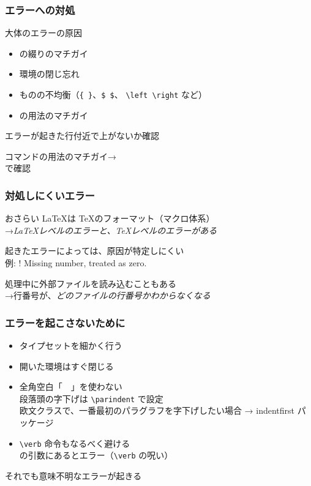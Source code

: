 \begin{frame}
	\frametitle{エラーへの対処}
	\begin{block}{大体のエラーの原因}
		\begin{itemize}
			\item {}の綴りのマチガイ
			\item 環境の閉じ忘れ
			\item ものの不均衡（\texttt{\{ \}}、\texttt{\$ \$}、
				\texttt{\textbackslash left \textbackslash right} など）
			\item {}の用法のマチガイ
		\end{itemize}
	\end{block}
	
	エラーが起きた行付近で上がないか確認
	
	コマンドの用法のマチガイ→\\
	 で確認
\end{frame}

\begin{frame}
	\frametitle{対処しにくいエラー}
	\begin{block}{おさらい}
		\LaTeX は \TeX のフォーマット（マクロ体系）\\
		→\emph{\LaTeX レベルのエラーと、\TeX レベルのエラーがある}
	\end{block}
	起きたエラーによっては、原因が特定しにくい\\
	{\footnotesize 例: {\errorfont ! Missing number, treated as zero.}}
	
	\pause
	処理中に外部ファイルを読み込むこともある\\
	→行番号が、\emph{どのファイルの行番号かわからなくなる}
\end{frame}

\begin{frame}[fragile]
	\frametitle{エラーを起こさないために}
	\begin{itemize}
		\item タイプセットを細かく行う
		\item 開いた環境はすぐ閉じる
		\item 全角空白「　」を使わない\\
			{\footnotesize 段落頭の字下げは \verb+\parindent+ で設定\\
			\tiny 欧文クラスで、一番最初のパラグラフを字下げしたい場合 → indentfirst パッケージ}
		\item \verb+\verb+ 命令もなるべく避ける\\
			{\footnotesize {}の引数にあるとエラー（\verb+\verb+ の呪い）}
	\end{itemize}
	\pause
	それでも意味不明なエラーが起きる
\end{frame}

